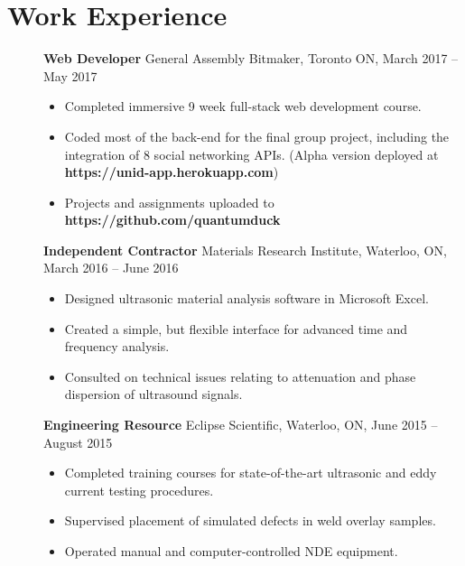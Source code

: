 \documentclass[10pt]{article}
\begin{document}
\section*{Work Experience}

\begin{description}
\item[] \textbf{Web Developer}\newline{}%
General Assembly Bitmaker, Toronto ON, March 2017 -- May 2017
\begin{itemize}
\item Completed immersive 9 week full-stack web development course.
\item Coded most of the back-end for the final group project, including the integration of 8 social networking APIs. (Alpha version deployed at \textbf{https://unid-app.herokuapp.com})
\item Projects and assignments uploaded to \textbf{https://github.com/quantumduck}
\end{itemize}

\item[] \textbf{Independent Contractor}  \newline{}%
Materials Research Institute, Waterloo, ON, March 2016 -- June 2016
\begin{itemize}
\item Designed ultrasonic material analysis software in Microsoft Excel.
\item Created a simple, but flexible interface for advanced time and frequency analysis.
\item Consulted on technical issues relating to attenuation and phase dispersion of ultrasound signals.
\end{itemize}

\item[] \textbf{Engineering Resource} \newline{}%
Eclipse Scientific, Waterloo, ON, June 2015 -- August 2015
\begin{itemize}
\item Completed training courses for state-of-the-art ultrasonic and eddy current testing procedures.
\item Supervised placement of simulated defects in weld overlay samples.
\item Operated manual and computer-controlled NDE equipment.
\end{itemize}

\end{description}
\end{document}

